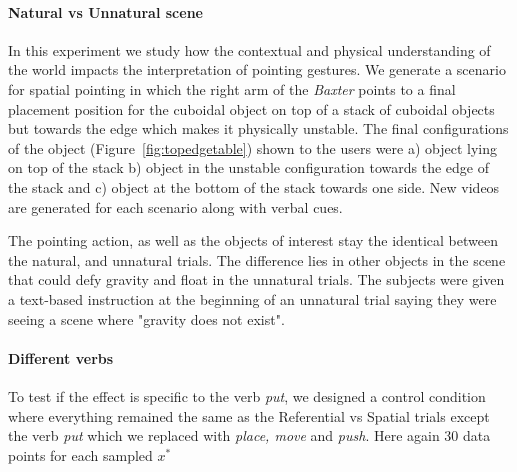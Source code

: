 \paragraph{Natural vs Unnatural scene}
In this experiment we study how the contextual and physical understanding of the world impacts the interpretation of pointing gestures. We generate a scenario for spatial pointing in which the right arm of the \textit{Baxter} points to a final placement position for the cuboidal object on top of a stack of cuboidal objects but towards the edge which makes it physically unstable. The final configurations of the object (Figure~\ref{fig:topedgetable}) shown to the users were a) object lying on top of the stack b) object in the unstable configuration towards the edge of the stack and c) object at the bottom of the stack towards one side. New videos are generated for each scenario along with verbal cues.

The pointing action, as well as the objects of interest stay the identical between the natural, and unnatural trials. The difference lies in other objects in the scene that could defy gravity and float in the unnatural trials. The subjects were given a text-based instruction at the beginning of an unnatural trial saying they were seeing a scene where "gravity does not exist". 



\paragraph{Different verbs}  
To test if the effect is specific to the verb \textit{put}, we designed a control condition where everything remained the same as the Referential vs Spatial trials except the verb \textit{put} which we replaced with \textit{place, move} and \textit{push}. Here again 30 data points for each sampled $x^*$

